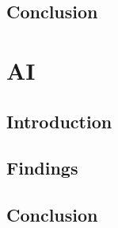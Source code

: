 \documentclass{projdoc}
\begin{document}
\subsection{Conclusion}

\section{AI}

\subsection{Introduction}

\subsection{Findings}

\subsection{Conclusion}
\end{document}

